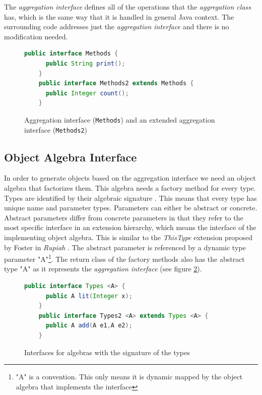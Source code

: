 \documentclass{report}
\begin{document}
The \emph{aggregation interface} defines all of the operations that the \emph{aggregation class} has, which is the same way that it is handled in general Java context. The surrounding code addresses just the \emph{aggregation interface} and there is no modification needed.

\begin{figure}[h]
\begin{lstlisting}[language=java]
    public interface Methods {
      public String print();
    }
    public interface Methods2 extends Methods {
      public Integer count();
    }
\end{lstlisting}
\caption{Aggregation interface (\lstinline{Methods}) and an extended aggregation interface (\lstinline{Methods2})}
\label{aggregationInterfaces}
\end{figure}

\subsection{Object Algebra Interface}

\label{abstractParameter}

In order to generate objects based on the aggregation interface we need an object algebra that factorizes them. This algebra needs a factory method for every type. Types are identified by their algebraic signature \cite{Oliv-Extensibility-2012}. This means that every type has unique name and parameter types. Parameters can either be abstract or concrete. Abstract parameters differ from concrete parameters in that they refer to the most specific interface in an extension hierarchy, which means the interface of the implementing object algebra. This is similar to the \emph{ThisType} extension proposed by Foster in \emph{Rupiah} \cite{Foster-Rupiah-2001}. The abstract parameter is referenced by a dynamic type parameter "A"\footnote{"A" is a convention. This only means it is dynamic mapped by the object algebra that implements the interface}. The return class of the factory methods also has the abstract type "A" as it represents the \emph{aggregation interface} (see figure \ref{algebraInterfaces}).

\begin{figure}[h]
\begin{lstlisting}[language=java]
    public interface Types <A> {
      public A lit(Integer x);
    }
    public interface Types2 <A> extends Types <A> {
      public A add(A e1,A e2);
    }
\end{lstlisting}
\caption{Interfaces for algebras with the signature of the types}
\label{algebraInterfaces}
\end{figure}
\end{document}
